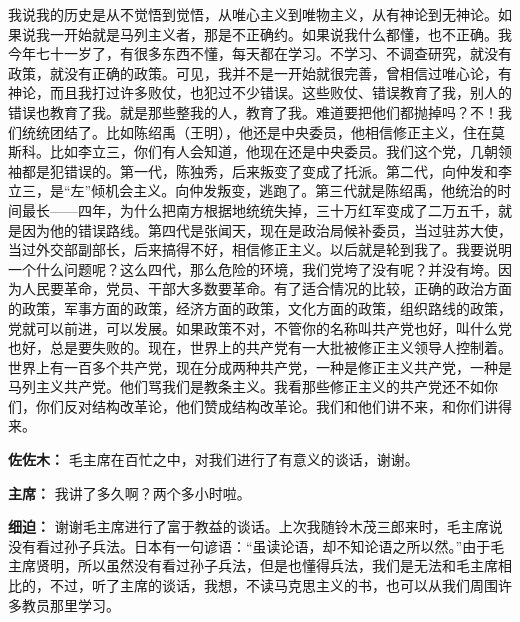 \begin{list}{}
我说我的历史是从不觉悟到觉悟，从唯心主义到唯物主义，从有神论到无神论。如果说我一开始就是马列主义者，那是不正确约。如果说我什么都懂，也不正确。我今年七十一岁了，有很多东西不懂，每天都在学习。不学习、不调查研究，就没有政策，就没有正确的政策。可见，我并不是一开始就很完善，曾相信过唯心论，有神论，而且我打过许多败仗，也犯过不少错误。这些败仗、错误教育了我，别人的错误也教育了我。就是那些整我的人，教育了我。难道要把他们都抛掉吗？不！我们统统团结了。比如陈绍禹（王明），他还是中央委员，他相信修正主义，住在莫斯科。比如李立三，你们有人会知道，他现在还是中央委员。我们这个党，几朝领袖都是犯错误的。第一代，陈独秀，后来叛变了变成了托派。第二代，向仲发和李立三，是“左”倾机会主义。向仲发叛变，逃跑了。第三代就是陈绍禹，他统治的时间最长——四年，为什么把南方根据地统统失掉，三十万红军变成了二万五千，就是因为他的错误路线。第四代是张闻天，现在是政治局候补委员，当过驻苏大使，当过外交部副部长，后来搞得不好，相信修正主义。以后就是轮到我了。我要说明一个什么问题呢？这么四代，那么危险的环境，我们党垮了没有呢？并没有垮。因为人民要革命，党员、干部大多数要革命。有了适合情况的比较，正确的政治方面的政策，军事方面的政策，经济方面的政策，文化方面的政策，组织路线的政策，党就可以前进，可以发展。如果政策不对，不管你的名称叫共产党也好，叫什么党也好，总是要失败的。现在，世界上的共产党有一大批被修正主义领导人控制着。世界上有一百多个共产党，现在分成两种共产党，一种是修正主义共产党，一种是马列主义共产党。他们骂我们是教条主义。我看那些修正主义的共产党还不如你们，你们反对结构改革论，他们赞成结构改革论。我们和他们讲不来，和你们讲得来。

\item[\textbf{佐佐木：}] 毛主席在百忙之中，对我们进行了有意义的谈话，谢谢。

\item[\textbf{主席：}] 我讲了多久啊？两个多小时啦。

\item[\textbf{细迫：}] 谢谢毛主席进行了富于教益的谈话。上次我随铃木茂三郎来时，毛主席说没有看过孙子兵法。日本有一句谚语：“虽读论语，却不知论语之所以然。”由于毛主席贤明，所以虽然没有看过孙子兵法，但是也懂得兵法，我们是无法和毛主席相比的，不过，听了主席的谈话，我想，不读马克思主义的书，也可以从我们周围许多教员那里学习。


\end{list}

